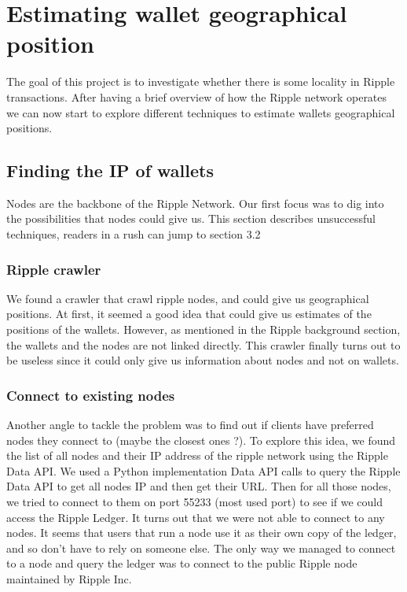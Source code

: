 \section{Estimating wallet geographical position}
The goal of this project is to investigate whether there is some locality in Ripple transactions. After having a brief overview of how the Ripple network operates we can now start to explore different techniques to estimate wallets geographical positions.

\subsection{Finding the IP of wallets}
Nodes are the backbone of the Ripple Network. Our first focus was to dig into the possibilities that nodes could give us. This section describes unsuccessful techniques, readers in a rush can jump to section 3.2

\subsubsection{Ripple crawler}
We found a crawler\cite{crawler} that crawl ripple nodes, and could give us geographical positions. At first, it seemed a good idea that could give us estimates of the positions of the wallets. However, as mentioned in the Ripple background section, the wallets and the nodes are not linked directly. This crawler finally turns out to be useless since it could only give us information about nodes and not on wallets.

\subsubsection{Connect to existing nodes}
Another angle to tackle the problem was to find out if clients have preferred nodes they connect to (maybe the closest ones ?). To explore this idea, we found the list of all nodes and their IP address of the ripple network using the Ripple Data API\cite{data-api}. We used a Python implementation Data API calls to query the Ripple Data API to get all nodes IP and then get their URL. Then for all those nodes, we tried to connect to them on port 55233 (most used port) to see if we could access the Ripple Ledger. It turns out that we were not able to connect to any nodes. It seems that users that run a node use it as their own copy of the ledger, and so don't have to rely on someone else. The only way we managed to connect to a node and query the ledger was to connect to the public Ripple node maintained by Ripple Inc. 

